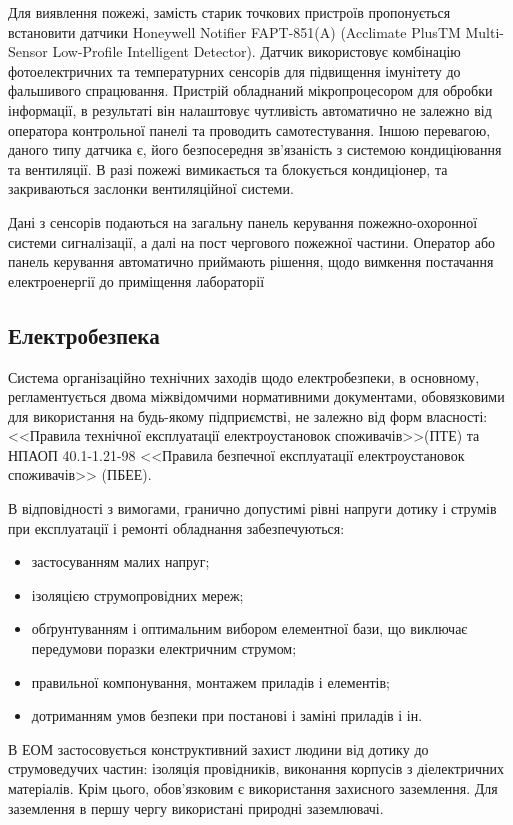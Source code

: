 \documentclass[ukrainian,utf8,simple,floatsingle,hpadding=5mm]{eskdtext}
\begin{document}
Для виявлення пожежі, замість старик точкових пристроїв пропонується
встановити датчики Honeywell Notifier FAPT-851(A)
(Acclimate PlusTM Multi-Sensor Low-Profile Intelligent Detector). Датчик 
використовує комбінацію фотоелектричних та температурних сенсорів для
підвищення імунітету до фальшивого спрацювання. Пристрій обладнаний мікропроцесором
для обробки інформації, в результаті він налаштовує чутливість автоматично
не залежно від оператора контрольної панелі та проводить самотестування.
Іншою перевагою, даного типу датчика є, його безпосередня зв'язаність з системою
кондиціювання та вентиляції. В разі пожежі вимикається та блокується кондиціонер,
та закриваються заслонки вентиляційної системи.

Дані з сенсорів подаються на загальну панель керування пожежно-охоронної системи
сигналізації, а далі на пост чергового пожежної частини. Оператор або панель
керування автоматично приймають рішення, щодо вимкення постачання електроенергії
до приміщення лабораторії

\subsection{Електробезпека}

Система організаційно технічних заходів щодо електробезпеки, в основному, регламентується
двома міжвідомчими нормативними документами, обовязковими для використання на будь-якому 
підприємстві, не залежно від форм власності: <<Правила технічної експлуатації електроустановок споживачів>>(ПТЕ) та
НПАОП 40.1-1.21-98 <<Правила безпечної експлуатації електроустановок споживачів>> (ПБЕЕ).

В відповідності з вимогами, гранично допустимі рівні напруги дотику і 
струмів при експлуатації і ремонті обладнання забезпечуються:
\begin{itemize}
 \item застосуванням малих напруг; 
 \item ізоляцією струмопровідних мереж; 
 \item обґрунтуванням і оптимальним вибором елементної бази, що виключає передумови 
поразки електричним струмом; 
 \item правильної компонування, монтажем приладів і елементів; 
 \item дотриманням умов безпеки при постанові і заміні приладів і ін.
\end{itemize}

В ЕОМ застосовується конструктивний захист людини від дотику до струмоведучих частин: 
ізоляція провідників, виконання корпусів з діелектричних матеріалів. Крім цього, 
обов'язковим є використання захисного заземлення. Для заземлення в першу чергу використані природні заземлювачі.
\end{document}
